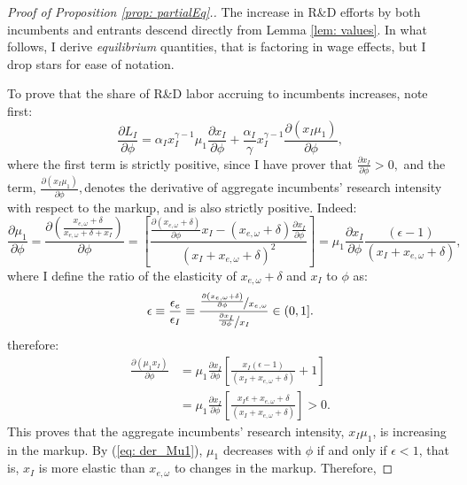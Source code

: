 \begin{proof}[Proof of Proposition \ref{prop: partialEq}.]
 The increase in R\&D efforts by both incumbents and entrants descend
directly from Lemma \ref{lem: values}. In what follows, I derive
\emph{equilibrium }quantities, that is factoring in wage effects,
but I drop stars for ease of notation. 

To prove that the share of R\&D labor accruing to incumbents increases,
note first:
\[
\frac{\partial L_{I}}{\partial\phi}=\alpha_{I}x_{I}^{\gamma-1}\mu_{1}\frac{\partial x_{I}}{\partial\phi}+\frac{\alpha_{I}}{\gamma}x_{I}^{\gamma-1}\frac{\partial\left(x_{I}\mu_{1}\right)}{\partial\phi},
\]
where the first term is strictly positive, since I have prover that
$\frac{\partial x_{I}}{\partial\phi}>0,$ and the term, $\frac{\partial\left(x_{I}\mu_{1}\right)}{\partial\phi},$denotes
the derivative of aggregate incumbents' research intensity with respect
to the markup, and is also strictly positive. Indeed:
\begin{equation}
\frac{\partial\mu_{1}}{\partial\phi}=\frac{\partial\left(\frac{x_{e,\omega}+\delta}{x_{e,\omega}+\delta+x_{I}}\right)}{\partial\phi}=\left[\frac{\frac{\partial\left(x_{e,\omega}+\delta\right)}{\partial\phi}x_{I}-\left(x_{e,\omega}+\delta\right)\frac{\partial x_{I}}{\partial\phi}}{\left(x_{I}+x_{e,\omega}+\delta\right)^{2}}\right]=\mu_{1}\frac{\partial x_{I}}{\partial\phi}\frac{\left(\epsilon-1\right)}{\left(x_{I}+x_{e,\omega}+\delta\right)},\label{eq: der_Mu1}
\end{equation}
where I define the ratio of the elasticity of $x_{e,\omega}+\delta$
and $x_{I}$ to $\phi$ as:
\[
\epsilon\equiv\frac{\epsilon_{e}}{\epsilon_{I}}\equiv\frac{\nicefrac{\frac{\partial\left(x_{e,\omega}+\delta\right)}{\partial\phi}}{x_{e,\omega}}}{\nicefrac{\frac{\partial x_{I}}{\partial\phi}}{x_{I}}}\in(0,1].
\]
therefore:
\begin{align*}
\frac{\partial\left(\mu_{1}x_{I}\right)}{\partial\phi} & =\mu_{1}\frac{\partial x_{I}}{\partial\phi}\left[\frac{x_{I}\left(\epsilon-1\right)}{\left(x_{I}+x_{e,\omega}+\delta\right)}+1\right]\\
 & =\mu_{1}\frac{\partial x_{I}}{\partial\phi}\left[\frac{x_{I}\epsilon+x_{e,\omega}+\delta}{\left(x_{I}+x_{e,\omega}+\delta\right)}\right]>0.
\end{align*}
This proves that the aggregate incumbents' research intensity, $x_{I}\mu_{1}$,
is increasing in the markup. By (\ref{eq: der_Mu1}), $\mu_{1}$ decreases
with $\phi$ if and only if $\epsilon<1$, that is, $x_{I}$ is more
elastic than $x_{e,\omega}$ to changes in the markup. Therefore,

\end{proof}
